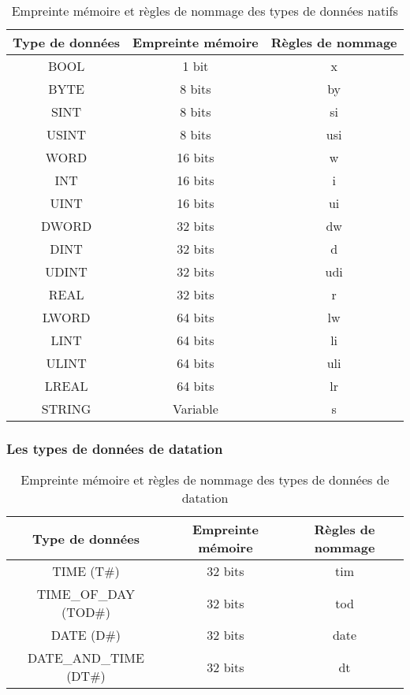 \begin{table}[htbp]
    \centering
    \begin{tabular}{|c|c|c|}
        \hline
        \rowcolor{gray!30} \textbf{Type de données} & \textbf{Empreinte mémoire} & \textbf{Règles de nommage} \\
        \hline
        BOOL & 1 bit & x \\
        \hline
        BYTE & 8 bits & by \\
        \hline
        SINT & 8 bits & si \\
        \hline
        USINT & 8 bits & usi \\
        \hline
        WORD & 16 bits & w \\
        \hline
        INT & 16 bits & i \\
        \hline
        UINT & 16 bits & ui \\
        \hline
        DWORD & 32 bits & dw \\
        \hline
        DINT & 32 bits & d \\
        \hline
        UDINT & 32 bits & udi \\
        \hline
        REAL & 32 bits & r \\
        \hline
        LWORD & 64 bits & lw \\
        \hline
        LINT & 64 bits & li \\
        \hline
        ULINT & 64 bits & uli \\
        \hline
        LREAL & 64 bits & lr \\
        \hline
        STRING & Variable & s \\
        \hline
    \end{tabular}
    \caption{Empreinte mémoire et règles de nommage des types de données natifs}
    \label{tab:types_donnees}
\end{table}

\subsubsection{Les types de données de datation}
\begin{table}[htbp]
    \centering
    \begin{tabular}{|c|c|c|}
        \hline
        \rowcolor{gray!30} \textbf{Type de données} & \textbf{Empreinte mémoire} & \textbf{Règles de nommage} \\
        \hline
        TIME (T\#) & 32 bits & tim \\
        \hline
        TIME\_OF\_DAY (TOD\#) & 32 bits & tod \\
        \hline
        DATE (D\#) & 32 bits & date \\
        \hline
        DATE\_AND\_TIME (DT\#) & 32 bits & dt \\
        \hline
    \end{tabular}
    \caption{Empreinte mémoire et règles de nommage des types de données de datation}
\end{table}

